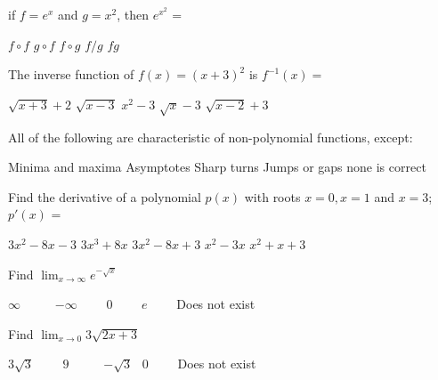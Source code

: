\documentclass[legalpaper, 12pt, addpoints]{exam}
\begin{document}
\begin{questions}
\question if $f=e^x$ and $g=x^2$, then $e^{x^2}$ =  
 \begin{choices}
            \choice $f\circ f $
            \choice $g\circ f$
            \CorrectChoice $f\circ g$
            \choice $f/g$
            \choice $fg$
\end{choices}
    \vspace{0.10in}

\question The inverse function of $f(x) = (x+3)^2$ is  $f^{-1}(x)=$   
  \begin{choices}
            \choice $\sqrt{x+3} +2 $
            \choice $\sqrt{x-3}  $
            \choice $x^2 - 3$
            \CorrectChoice $\sqrt{x}-3$
            \choice $\sqrt{x-2}+3$
 \end{choices}
    \vspace{0.10in}

\question All of the following are characteristic of non-polynomial functions, except: 
\begin{choices}
	\CorrectChoice Minima and maxima
	\choice Asymptotes
	\choice Sharp turns
	\choice Jumps or gaps
	\choice none is correct
\end{choices}

\question Find the derivative of a polynomial $p(x)$ with roots $x=0, x=1$ and $x=3$; \(p'(x)\) = 
\begin{choices}
    \choice $3x^2-8x-3$
    \choice $3x^3+8x$
    \CorrectChoice $3x^2-8x+3$
    \choice $x^2-3x$
    \choice $x^2+x+3$
\end{choices}   

        
\vspace{0.10in}
\question Find $\lim_{x\to\infty} e^{-\sqrt{x}}$ 

\begin{oneparchoices}
        \choice  $\infty \qquad \ \ $
        \choice  $-\infty \qquad$ 
        \CorrectChoice  $0 \qquad$ 
        \choice  $e \qquad$
        \choice  Does not exist $\qquad$
        \end{oneparchoices}
\vspace{0.15in}

\question Find $\displaystyle \lim_{x\rightarrow 0} 3\sqrt{2x+3}$

\begin{oneparchoices}
\CorrectChoice  $3\sqrt{3} \qquad$
        \choice  $9 \qquad \ \  $
        \choice  $-\sqrt{3} \ \  $ 
        \choice  $0\qquad$ 
        \choice  Does not exist
 \end{oneparchoices}
\vspace{0.1in}


\end{questions}
\end{document}
